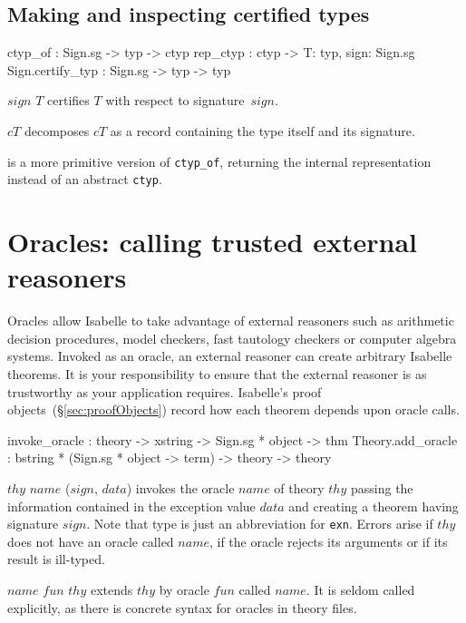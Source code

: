 \subsection{Making and inspecting certified types}
\begin{ttbox}
ctyp_of          : Sign.sg -> typ -> ctyp
rep_ctyp         : ctyp -> {\ttlbrace}T: typ, sign: Sign.sg\ttrbrace
Sign.certify_typ : Sign.sg -> typ -> typ
\end{ttbox}
\begin{ttdescription}
  
\item[\ttindexbold{ctyp_of} $sign$ $T$]  certifies
  $T$ with respect to signature~$sign$.
  
\item[\ttindexbold{rep_ctyp} $cT$] decomposes $cT$ as a record
  containing the type itself and its signature.
  
\item[\ttindexbold{Sign.certify_typ}] is a more primitive version of
  \texttt{ctyp_of}, returning the internal representation instead of
  an abstract \texttt{ctyp}.

\end{ttdescription}


\section{Oracles: calling trusted external reasoners}
\label{sec:oracles}

Oracles allow Isabelle to take advantage of external reasoners such as
arithmetic decision procedures, model checkers, fast tautology checkers or
computer algebra systems.  Invoked as an oracle, an external reasoner can
create arbitrary Isabelle theorems.  It is your responsibility to ensure that
the external reasoner is as trustworthy as your application requires.
Isabelle's proof objects~(\S\ref{sec:proofObjects}) record how each theorem
depends upon oracle calls.

\begin{ttbox}
invoke_oracle     : theory -> xstring -> Sign.sg * object -> thm
Theory.add_oracle : bstring * (Sign.sg * object -> term) -> theory 
                    -> theory
\end{ttbox}
\begin{ttdescription}
\item[\ttindexbold{invoke_oracle} $thy$ $name$ ($sign$, $data$)]
  invokes the oracle $name$ of theory $thy$ passing the information
  contained in the exception value $data$ and creating a theorem
  having signature $sign$.  Note that type  is just an
  abbreviation for \texttt{exn}.  Errors arise if $thy$ does not have
  an oracle called $name$, if the oracle rejects its arguments or if
  its result is ill-typed.
  
\item[\ttindexbold{Theory.add_oracle} $name$ $fun$ $thy$] extends
  $thy$ by oracle $fun$ called $name$.  It is seldom called
  explicitly, as there is concrete syntax for oracles in theory files.
\end{ttdescription}

